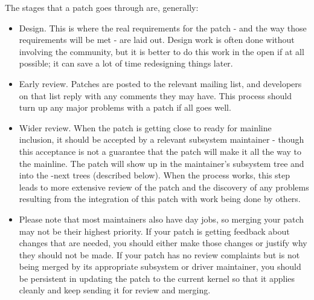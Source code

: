 \documentclass[a4paper,8pt,english]{sphinxmanual}
\begin{document}
The stages that a patch goes through are, generally:
\begin{itemize}
\item {} 
Design.  This is where the real requirements for the patch - and the way
those requirements will be met - are laid out.  Design work is often
done without involving the community, but it is better to do this work
in the open if at all possible; it can save a lot of time redesigning
things later.

\item {} 
Early review.  Patches are posted to the relevant mailing list, and
developers on that list reply with any comments they may have.  This
process should turn up any major problems with a patch if all goes
well.

\item {} 
Wider review.  When the patch is getting close to ready for mainline
inclusion, it should be accepted by a relevant subsystem maintainer -
though this acceptance is not a guarantee that the patch will make it
all the way to the mainline.  The patch will show up in the maintainer's
subsystem tree and into the -next trees (described below).  When the
process works, this step leads to more extensive review of the patch and
the discovery of any problems resulting from the integration of this
patch with work being done by others.

\end{itemize}
\begin{itemize}
\item {} 
Please note that most maintainers also have day jobs, so merging
your patch may not be their highest priority.  If your patch is
getting feedback about changes that are needed, you should either
make those changes or justify why they should not be made.  If your
patch has no review complaints but is not being merged by its
appropriate subsystem or driver maintainer, you should be persistent
in updating the patch to the current kernel so that it applies cleanly
and keep sending it for review and merging.

\end{itemize}
\end{document}
